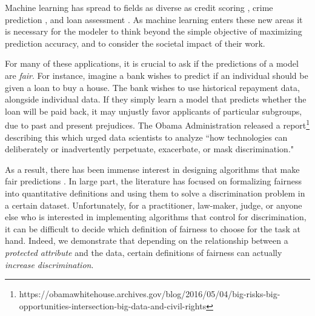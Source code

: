 Machine learning has spread to fields as diverse as credit scoring
\cite{khandani2010consumer}, crime prediction
\cite{brennan2009evaluating}, and loan assessment
\cite{mahoney2007method}. As machine learning enters these new areas
it is necessary for the modeler to think beyond the simple objective
of maximizing prediction accuracy, and to consider the societal impact
of their work. 

For many of these applications, it is crucial to ask if the
predictions of a model are \emph{fair}. For instance, imagine a bank
wishes to predict if an individual should be given a loan to buy a
house. The bank wishes to use historical repayment data, alongside
individual data. If they simply learn a model that predicts whether
the loan will be paid back, it may unjustly favor applicants of
particular subgroups, due to past and present prejudices. The Obama
Administration released a report\footnote{https://obamawhitehouse.archives.gov/blog/2016/05/04/big-risks-big-opportunities-intersection-big-data-and-civil-rights}
describing this which urged data
scientists to analyze ``how technologies can deliberately or
inadvertently perpetuate, exacerbate, or mask
discrimination."

As a result, there has been immense interest in designing
algorithms that make fair predictions
\cite{hardt2016equality,dwork2012fairness,joseph2016rawlsian,kamishima2011fairness,zliobaite2015survey,zafar2016fairness,zafar2015learning,grgiccase,kleinberg2016inherent,calders2010three,kamiran2012data,bolukbasi2016man,kamiran2009classifying,zemel2013learning,louizos2015variational}. 
In large part, the literature has
focused on formalizing fairness into quantitative definitions and using them to solve a
discrimination problem in a certain dataset. Unfortunately, for a
practitioner, law-maker, judge, or anyone else who is interested in
implementing algorithms that control for discrimination, it can be
difficult to decide which definition of fairness to choose for the
task at hand. Indeed, we demonstrate that depending on the
relationship between a {\it protected attribute} and the data, certain
definitions of fairness can actually \emph{increase discrimination}.


